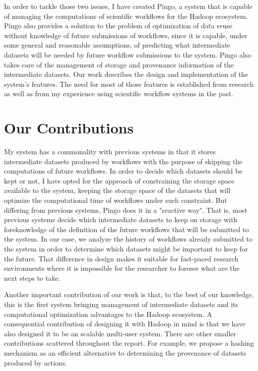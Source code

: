 In order to tackle those two issues, I have created Pingo, a system that is capable of managing the computations of scientific workflows for the Hadoop ecosystem. Pingo also provides a solution to the problem of optimization of data reuse without knowledge of future submissions of workflows, since it is capable, under some general and reasonable assumptions, of predicting what intermediate datasets will be needed by future workflow submissions to the system. Pingo also takes care of the management of storage and provenance information of the intermediate datasets. Our work describes the design and implementation of the system's features.  The need for most of those features is established from research as well as from my experience using scientific workflow systems in the past. 

\section{Our Contributions}
My system has a commonality with previous systems in that it stores intermediate datasets produced by workflows with the purpose of skipping the computations of future workflows.  In order to decide which datasets should be kept or not, I have opted for the approach of constraining the storage space available to the system, keeping the storage space of the datasets that will optimize the computational time of workflows under such constraint. But differing from previous systems, Pingo does it in a "reactive way".  That is, most previous systems decide which intermediate datasets to keep on storage with foreknowledge of the definition of the future workflows that will be submitted to the system.  In our case, we analyze the history of workflows already submitted to the system in order to determine which datasets might be important to keep for the future. That difference in design makes it suitable for fast-paced research environments where it is impossible for the researcher to foresee what are the next steps to take.

Another important contribution of our work is that, to the best of our knowledge, this is the first system bringing management of intermediate datasets and its computational optimization advantages to the Hadoop ecosystem.  A consequential contribution of designing it with Hadoop in mind is that we have also designed it to be an scalable multi-user system.  There are other smaller contributions scattered throughout the report. For example, we propose a hashing mechanism as an efficient alternative to determining the provenance of datasets produced by actions.  

